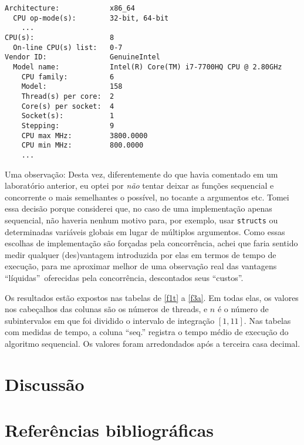 \documentclass{article}
\begin{document}
\begin{lstlisting}
Architecture:            x86_64
  CPU op-mode(s):        32-bit, 64-bit
    ...
CPU(s):                  8
  On-line CPU(s) list:   0-7
Vendor ID:               GenuineIntel
  Model name:            Intel(R) Core(TM) i7-7700HQ CPU @ 2.80GHz
    CPU family:          6
    Model:               158
    Thread(s) per core:  2
    Core(s) per socket:  4
    Socket(s):           1
    Stepping:            9
    CPU max MHz:         3800.0000
    CPU min MHz:         800.0000
    ...
\end{lstlisting}

  Uma observação: Desta vez, diferentemente do que havia comentado em um laboratório anterior, eu optei por \emph{não} tentar deixar as funções sequencial e concorrente o mais semelhantes o possível, no tocante a argumentos etc. Tomei essa decisão porque considerei que, no caso de uma implementação apenas sequencial, não haveria nenhum motivo para, por exemplo, usar \texttt{structs} ou determinadas variáveis globais em lugar de múltiplos argumentos. Como essas escolhas de implementação são forçadas pela concorrência, achei 
  que faria sentido medir qualquer (des)vantagem introduzida por elas 
  em termos de tempo de execução, para me aproximar melhor de uma 
  observação real das vantagens ``líquidas''\ oferecidas pela concorrência, descontados seus ``custos''.

  Os resultados estão expostos nas tabelas de \ref{f1t} a \ref{f3a}. Em todas elas, os valores nos cabeçalhos das colunas são os números de threads, e $n$ é o número de subintervalos em que foi dividido o intervalo de integração $[1, 11]$. Nas tabelas com medidas de tempo, a coluna ``seq.'' registra o tempo médio de execução do algoritmo sequencial. Os valores foram arredondados após a terceira casa decimal.

  \section{Discussão} \label{disc}

  \section{Referências bibliográficas} \label{bibl}

  \printbibliography[heading=none]

  \newpage
\end{document}
